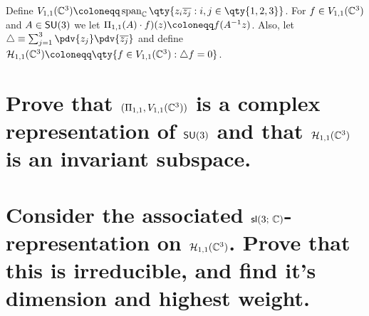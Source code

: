 \documentclass[
	pages,
	boxes,
	color=WildStrawberry
]{homework}
\begin{document}
\begin{solution}

\end{solution}

\begin{problem}
Define $V_{1, 1}(\C^3)\defeq \vspan_\C\qty{z_i\overline{z_j} : i, j\in\qty{1,2,3}}$. For $f\in V_{1,1}(\mathbb{C}^3)$ and $A\in \mathsf{SU}(3)$ we let $\Pi_{1,1}(A)\cdot f)(z)\defeq f(A^{-1}z)$. Also, let $\laplace \equiv \sum_{j = 1}^3 \pdv{z_j}\pdv{\overline{z_j}}$ and define $\mathcal{H}_{1,1}(\C^3)\defeq \qty{f\in V_{1, 1}(\C^3) : \laplace{f} = 0}$.
\begin{parts}
	\part{Prove that $(\Pi_{1,1}, V_{1,1}(\mathbb{C}^3))$ is a complex representation of $\mathsf{SU}(3)$ and that $\mathcal{H}_{1,1}(\mathbb{C}^3)$ is an invariant subspace.}\label{part:4a}
	\part{Consider the associated $\mathsf{sl}(3;\, \mathbb{C})$-representation on $\mathcal{H}_{1,1}(\mathbb{C}^3)$. Prove that this is irreducible, and find it's dimension and highest weight.}\label{part:4b}
\end{parts}
\end{problem}

\begin{solution}

\end{solution}
\end{document}
